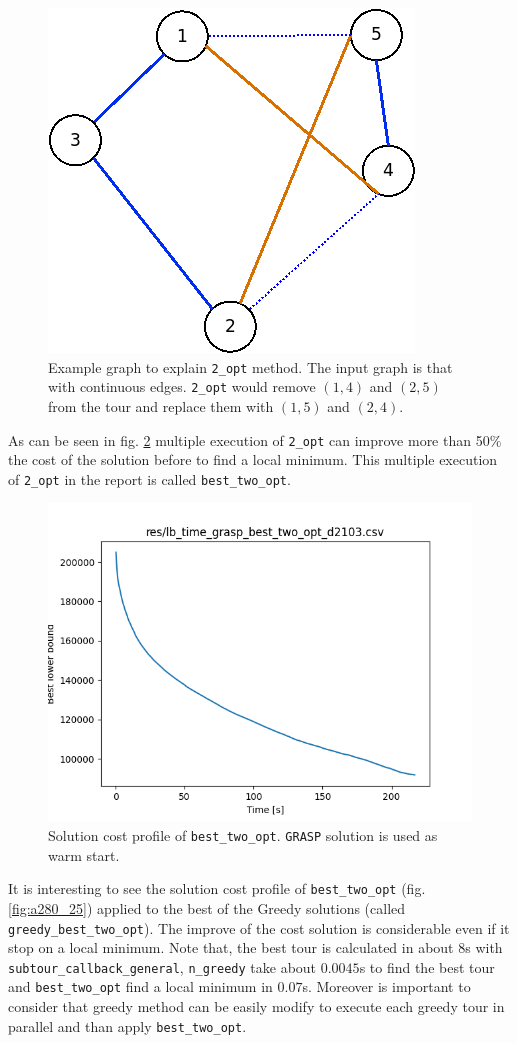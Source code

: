 \begin{figure}[h]
	\centering
	\includegraphics[width=.3\columnwidth]{img/2_opt_graph.png}
	\caption{Example graph to explain \texttt{2\_opt} method. The input graph is that with continuous edges. \texttt{2\_opt} would remove $ (1,4) $ and $ (2,5) $ from the tour and replace them with $ (1,5) $ and $  (2,4) $.}
	\label{fig:2_opt_graph}
\end{figure}
As can be seen in fig. \ref{fig:lb_time_grasp_best_two_opt_d2103} multiple execution of \texttt{2\_opt} can improve more than 50\% the cost of the solution before to find a local minimum. This multiple execution of \texttt{2\_opt} in the report is called \texttt{best\_two\_opt}.
\begin{figure}[!h]
\centering
\includegraphics[width=.6\columnwidth]{../res/lb_time_grasp_best_two_opt_d2103.png}
\caption{Solution cost profile of \texttt{best\_two\_opt}. \texttt{GRASP} solution is used as warm start.}
\label{fig:lb_time_grasp_best_two_opt_d2103}
\end{figure}

It is interesting to see the solution cost profile of \texttt{best\_two\_opt} (fig. \ref{fig:a280_25}) applied to the best of the Greedy solutions (called \texttt{greedy\_best\_two\_opt}). The improve of the cost solution is considerable even if it stop on a local minimum.  Note that, the best tour is calculated in about $ 8 $s with \texttt{subtour\_callback\_general}, \texttt{n\_greedy} take about $ 0.0045 $s to find the best tour and \texttt{best\_two\_opt} find a local minimum in $0.07$s. Moreover is important to consider that greedy method can be easily modify to execute each greedy tour in parallel and than apply \texttt{best\_two\_opt}.

